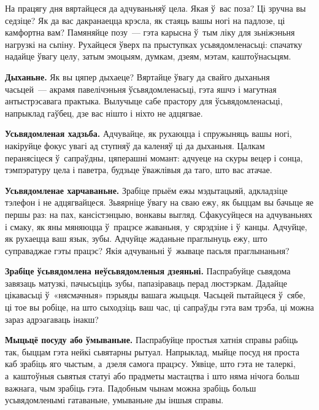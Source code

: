 На працягу дня вяртайцеся да адчуваньняў цела. Якая ў~вас поза? Ці зручна вы седзіце? Як да вас дакранаецца крэсла, як стаяць вашы ногі на падлозе, ці камфортна вам? Памяняйце позу~--- гэта карысна ў~тым ліку для зьніжэньня нагрузкі на сьпіну. Рухайцеся ўверх па прыступках усьвядомленасьці: спачатку надайце ўвагу целу, затым эмоцыям, думкам, дзеям, мэтам, каштоўнасьцям.


\textbf{Дыханьне.} Як вы цяпер дыхаеце? Вяртайце ўвагу да свайго дыханьня часьцей~--- акрамя павелічэньня ўсьвядомленасьці, гэта яшчэ і магутная антыстрэсавага практыка. Вылучыце сабе прастору для ўсьвядомленасьці, напрыклад гаўбец, дзе вас нішто і ніхто не адцягвае.

\textbf{Усьвядомленая хадзьба.} Адчувайце, як рухаюцца і спружыняць вашы ногі, накіруйце фокус увагі ад ступняў да каленяў ці да дыханьня. Цалкам перанясіцеся ў~сапраўдны, цяперашні момант: адчуеце на скуры вецер і сонца, тэмпэратуру цела і паветра, будзьце ўважлівыя да таго, што вас атачае.

\textbf{Усьвядомленае харчаваньне.} Зрабіце прыём ежы мэдытацыяй, адкладзіце тэлефон і не адцягвайцеся. Зьвярніце ўвагу на сваю ежу, як быццам вы бачыце яе першы раз: на пах, кансістэнцыю, вонкавы выгляд. Сфакусуйцеся на адчуваньнях і смаку, як яны мяняюцца ў~працэсе жаваньня, у~сярэдзіне і ў~канцы. Адчуйце, як рухаецца ваш язык, зубы. Адчуйце жаданьне праглынуць ежу, што суправаджае гэты працэс? Якія адчуваньні ў~жываце пасьля праглынаньня?

\textbf{Зрабіце ўсьвядомлена неўсьвядомленыя дзеяньні.} Паспрабуйце сьвядома завязаць матузкі, пачысьціць зубы, папазіраваць перад люстэркам. Дадайце цікавасьці ў~«нясмачныя» пэрыяды вашага жыцьця. Часьцей пытайцеся ў~сябе, ці тое вы робіце, на што сыходзіць ваш час, ці сапраўды гэта вам трэба, ці можна зараз адрэагаваць інакш?

\textbf{Мыцьцё посуду або ўмываньне.} Паспрабуйце простыя хатнія справы рабіць так, быццам гэта нейкі сьвятарны рытуал. Напрыклад, мыйце посуд ня проста каб зрабіць яго чыстым, а~дзеля самога працэсу. Уявіце, што гэта не талеркі, а~каштоўныя сьвятыя статуі або прадметы мастацтва і што няма нічога больш важнага, чым зрабіць гэта. Падобным чынам можна зрабіць больш усьвядомленымі гатаваньне, умываньне ды іншыя справы.

